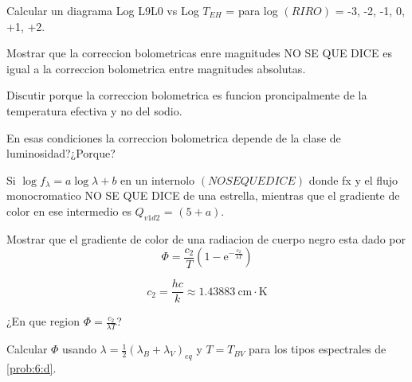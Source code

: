 \documentclass[12pt,a4paper]{practice}
\begin{document}
    \begin{problem}\label{prob:9}
        Calcular un diagrama Log L9L0 vs Log $T_{EH}$ = para log $\left(RIRO\right)$ = -3, -2, -1, 0, +1, +2.

            \begin{problempart}\label{prob:9:a}
                Mostrar que la correccion bolometricas enre magnitudes NO SE QUE DICE  es igual a la correccion bolometrica entre magnitudes absolutas.
            \end{problempart}
    \end{problem}

    \begin{problem}\label{prob:10}
        Discutir porque la correccion bolometrica es funcion proncipalmente de la temperatura efectiva y no del sodio.

        En esas condiciones la correccion bolometrica depende de la clase de luminosidad?¿Porque?
    \end{problem}

    \begin{problem}\label{prob:11}
        Si $\log f_{\lambda} = a\log\lambda + b$ en un internolo $\left(NO SE QUE DICE\right)$ donde fx y el flujo monocromatico NO SE QUE DICE de una estrella, mientras que el gradiente de color en ese intermedio es $Q_{v1d2}$ = $\left(5+a\right)$.
    \end{problem}

    \begin{problem}\label{prob:12}
        \begin{problempart}\label{prob:12:a}
            Mostrar que el gradiente de color de una radiacion de cuerpo negro esta dado por
            $$
                \Phi = \frac{c_2}{T}\left(1 - \mathrm{e}^{-\frac{c_2}{\lambda T}}\right)
            $$

            $$
                c_2 = \frac{hc}{k} \approx 1.43883\ \mathrm{cm \cdot K}
            $$
        \end{problempart}

        \begin{problempart}\label{prob:12:b}
            ¿En que region $\Phi = \frac{c_2}{\lambda T}$?
        \end{problempart}

        \begin{problempart}\label{prob:12:c}
            Calcular $\Phi$ usando $\lambda = \frac{1}{2}\left(\lambda_B + \lambda_V\right)_{eq}$ y $T = T_{BV}$ para los tipos espectrales de \ref{prob:6:d}.
        \end{problempart}
    \end{problem}
\end{document}
